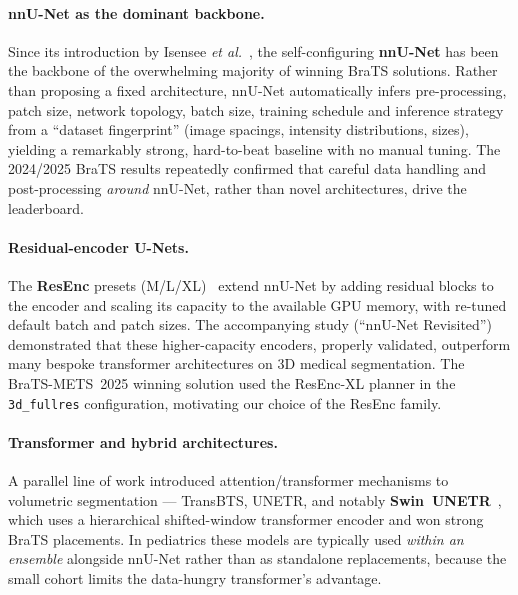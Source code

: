 \documentclass[11pt,a4paper]{article}
\begin{document}
\paragraph{nnU-Net as the dominant backbone.}
Since its introduction by Isensee \emph{et al.}~\cite{nnunet}, the self-configuring
\textbf{nnU-Net} has been the backbone of the overwhelming majority of winning BraTS
solutions. Rather than proposing a fixed architecture, nnU-Net automatically infers
pre-processing, patch size, network topology, batch size, training schedule and
inference strategy from a ``dataset fingerprint'' (image spacings, intensity
distributions, sizes), yielding a remarkably strong, hard-to-beat baseline with no
manual tuning. The 2024/2025 BraTS results repeatedly confirmed that careful data
handling and post-processing \emph{around} nnU-Net, rather than novel architectures,
drive the leaderboard.

\paragraph{Residual-encoder U-Nets.}
The \textbf{ResEnc} presets (M/L/XL)~\cite{resenc} extend nnU-Net by adding residual
blocks to the encoder and scaling its capacity to the available GPU memory, with
re-tuned default batch and patch sizes. The accompanying study (``nnU-Net
Revisited'') demonstrated that these higher-capacity encoders, properly validated,
outperform many bespoke transformer architectures on 3D medical segmentation. The
BraTS-METS~2025 winning solution used the ResEnc-XL planner in the
\texttt{3d\_fullres} configuration, motivating our choice of the ResEnc family.

\paragraph{Transformer and hybrid architectures.}
A parallel line of work introduced attention/transformer mechanisms to volumetric
segmentation --- TransBTS, UNETR, and notably \textbf{Swin~UNETR}~\cite{swinunetr},
which uses a hierarchical shifted-window transformer encoder and won strong BraTS
placements. In pediatrics these models are typically used \emph{within an ensemble}
alongside nnU-Net rather than as standalone replacements, because the small cohort
limits the data-hungry transformer's advantage.
\end{document}
